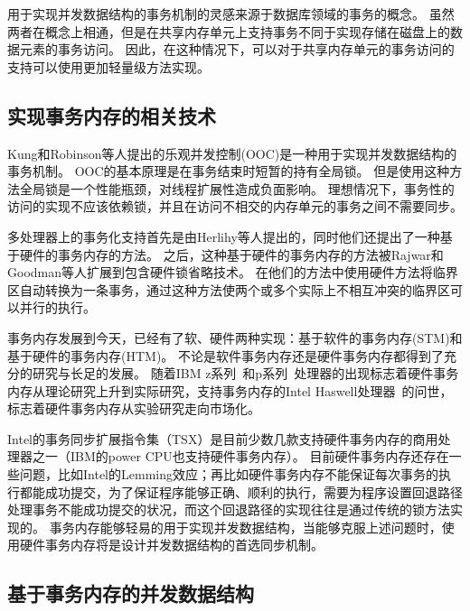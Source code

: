 用于实现并发数据结构的事务机制的灵感来源于数据库领域的事务的概念。
虽然两者在概念上相通，但是在共享内存单元上支持事务不同于实现存储在磁盘上的数据元素的事务访问。
因此，在这种情况下，可以对于共享内存单元的事务访问的支持可以使用更加轻量级方法实现。

\subsection{实现事务内存的相关技术}
Kung和Robinson等人提出的乐观并发控制(OOC)\cite{kung1981optimistic}是一种用于实现并发数据结构的事务机制。
OOC的基本原理是在事务结束时短暂的持有全局锁。
但是使用这种方法全局锁是一个性能瓶颈，对线程扩展性造成负面影响。
理想情况下，事务性的访问的实现不应该依赖锁，并且在访问不相交的内存单元的事务之间不需要同步。

多处理器上的事务化支持首先是由Herlihy等人\cite{herlihy1993transactional}提出的，同时他们还提出了一种基于硬件的事务内存的方法。
之后，这种基于硬件的事务内存的方法被Rajwar和Goodman等人扩展到包含硬件锁省略技术\cite{rajwar2001speculative,rajwar2002transactional}。
在他们的方法中使用硬件方法将临界区自动转换为一条事务，通过这种方法使两个或多个实际上不相互冲突的临界区可以并行的执行。

事务内存发展到今天，已经有了软、硬件两种实现：基于软件的事务内存(STM)和基于硬件的事务内存(HTM)。
不论是软件事务内存\cite{spear2010lightweight,saha2006mcrt,shavit1997software,linfei2010,wangruibo2007}还是硬件事务内存\cite{yen2007logtm,moore2006logtm,dalessandro2011hybrid,wangzhaoguo2014}都得到了充分的研究与长足的发展。
随着IBM z系列~\cite{Cain2013Robust}和p系列~\cite{Wang2012Evaluation}处理器的出现标志着硬件事务内存从理论研究上升到实际研究，支持事务内存的Intel Haswell处理器~\cite{Intel2015Intel}的问世，标志着硬件事务内存从实验研究走向市场化。

Intel的事务同步扩展指令集（TSX）是目前少数几款支持硬件事务内存的商用处理器之一（IBM的power CPU也支持硬件事务内存）。
目前硬件事务内存还存在一些问题，比如Intel的Lemming效应\cite{Afek2014Software}；再比如硬件事务内存不能保证每次事务的执行都能成功提交，为了保证程序能够正确、顺利的执行，需要为程序设置回退路径处理事务不能成功提交的状况，而这个回退路径的实现往往是通过传统的锁方法实现的。
事务内存能够轻易的用于实现并发数据结构，当能够克服上述问题时，使用硬件事务内存将是设计并发数据结构的首选同步机制。

\subsection{基于事务内存的并发数据结构}

